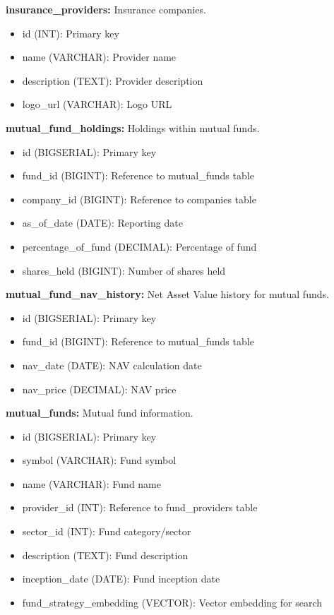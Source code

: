 \documentclass[12pt,a4paper]{report}
\begin{document}
\textbf{insurance\_providers:} Insurance companies.
\begin{itemize}
    \item id (INT): Primary key
    \item name (VARCHAR): Provider name
    \item description (TEXT): Provider description
    \item logo\_url (VARCHAR): Logo URL
\end{itemize}

\textbf{mutual\_fund\_holdings:} Holdings within mutual funds.
\begin{itemize}
    \item id (BIGSERIAL): Primary key
    \item fund\_id (BIGINT): Reference to mutual\_funds table
    \item company\_id (BIGINT): Reference to companies table
    \item as\_of\_date (DATE): Reporting date
    \item percentage\_of\_fund (DECIMAL): Percentage of fund
    \item shares\_held (BIGINT): Number of shares held
\end{itemize}

\textbf{mutual\_fund\_nav\_history:} Net Asset Value history for mutual funds.
\begin{itemize}
    \item id (BIGSERIAL): Primary key
    \item fund\_id (BIGINT): Reference to mutual\_funds table
    \item nav\_date (DATE): NAV calculation date
    \item nav\_price (DECIMAL): NAV price
\end{itemize}

\textbf{mutual\_funds:} Mutual fund information.
\begin{itemize}
    \item id (BIGSERIAL): Primary key
    \item symbol (VARCHAR): Fund symbol
    \item name (VARCHAR): Fund name
    \item provider\_id (INT): Reference to fund\_providers table
    \item sector\_id (INT): Fund category/sector
    \item description (TEXT): Fund description
    \item inception\_date (DATE): Fund inception date
    \item fund\_strategy\_embedding (VECTOR): Vector embedding for search
\end{itemize}
\end{document}

